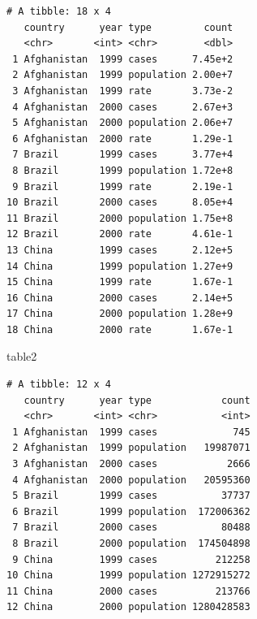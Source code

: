 \documentclass[
]{article}
\newenvironment{Shaded}{\begin{snugshade}}{\end{snugshade}}
\newcommand{\AttributeTok}[1]{\textcolor[rgb]{0.77,0.63,0.00}{#1}}
\newcommand{\CommentTok}[1]{\textcolor[rgb]{0.56,0.35,0.01}{\textit{#1}}}
\newcommand{\DecValTok}[1]{\textcolor[rgb]{0.00,0.00,0.81}{#1}}
\newcommand{\FunctionTok}[1]{\textcolor[rgb]{0.00,0.00,0.00}{#1}}
\newcommand{\NormalTok}[1]{#1}
\newcommand{\OtherTok}[1]{\textcolor[rgb]{0.56,0.35,0.01}{#1}}
\newcommand{\SpecialCharTok}[1]{\textcolor[rgb]{0.00,0.00,0.00}{#1}}
\newcommand{\StringTok}[1]{\textcolor[rgb]{0.31,0.60,0.02}{#1}}
\begin{document}
\begin{verbatim}
# A tibble: 18 x 4
   country      year type         count
   <chr>       <int> <chr>        <dbl>
 1 Afghanistan  1999 cases      7.45e+2
 2 Afghanistan  1999 population 2.00e+7
 3 Afghanistan  1999 rate       3.73e-2
 4 Afghanistan  2000 cases      2.67e+3
 5 Afghanistan  2000 population 2.06e+7
 6 Afghanistan  2000 rate       1.29e-1
 7 Brazil       1999 cases      3.77e+4
 8 Brazil       1999 population 1.72e+8
 9 Brazil       1999 rate       2.19e-1
10 Brazil       2000 cases      8.05e+4
11 Brazil       2000 population 1.75e+8
12 Brazil       2000 rate       4.61e-1
13 China        1999 cases      2.12e+5
14 China        1999 population 1.27e+9
15 China        1999 rate       1.67e-1
16 China        2000 cases      2.14e+5
17 China        2000 population 1.28e+9
18 China        2000 rate       1.67e-1
\end{verbatim}

\begin{Shaded}
\begin{Highlighting}[]
\NormalTok{table2}
\end{Highlighting}
\end{Shaded}

\begin{verbatim}
# A tibble: 12 x 4
   country      year type            count
   <chr>       <int> <chr>           <int>
 1 Afghanistan  1999 cases             745
 2 Afghanistan  1999 population   19987071
 3 Afghanistan  2000 cases            2666
 4 Afghanistan  2000 population   20595360
 5 Brazil       1999 cases           37737
 6 Brazil       1999 population  172006362
 7 Brazil       2000 cases           80488
 8 Brazil       2000 population  174504898
 9 China        1999 cases          212258
10 China        1999 population 1272915272
11 China        2000 cases          213766
12 China        2000 population 1280428583
\end{verbatim}

\begin{Shaded}
\end{Shaded}
\end{document}
